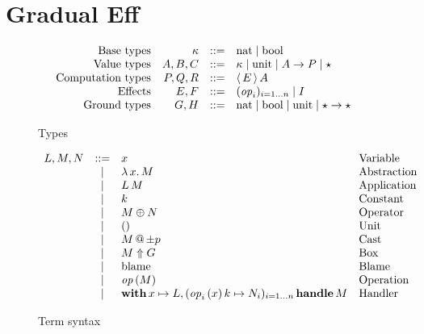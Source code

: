 \section{Gradual Eff}

\newcommand\ruledef{::=}
\newcommand\rulealt{\;|\;}
\newcommand\tyarr[2]{#1 \to #2}
\newcommand\tyany{\star}
\newcommand\cty[2]{\langle\,#1\,\rangle\,#2}
\newcommand\tynat{\mathrm{nat}}
\newcommand\tybool{\mathrm{bool}}
\newcommand\tyunit{\mathrm{unit}}
\newcommand\effany{\ding{73}}
\newcommand\effop{\mathit{op}}
\newcommand\app[2]{#1\,#2}
\newcommand\lam[2]{\lambda\, #1 .\, #2}
\newcommand\cast[2]{#1 \,\MVAt\, #2}
\newcommand\tbox[2]{#1 \Uparrow #2}
\newcommand\blame{\mathrm{blame}}
\newcommand\perform[2]{#1\left(#2\right)}
\newcommand\handle[2]{\mathbf{with}\,#1\,\mathbf{handle}\,#2}
\newcommand\fori[3]{(#3)_{#1=1\dots #2}}
\newcommand\treturn[1]{\mathbf{return}\,#1}

\begin{figure}
$$
\begin{array}{rrcll}
 \text{Base types} & \kappa  & \ruledef & \tynat \rulealt \tybool \\
 \text{Value types} & A, B, C & \ruledef & \kappa \rulealt \tyunit \rulealt \tyarr{A}{P} \rulealt \tyany & \\
 \text{Computation types} & P, Q, R & \ruledef & \cty{E}{A} &  \\
 \text{Effects} & E, F & \ruledef & \fori{i}{n}{\effop_i} \rulealt \effany & \\
 \text{Ground types} & G, H & \ruledef & \tynat \rulealt \tybool \rulealt \tyunit \rulealt \tyarr{\tyany}{\tyany}
\end{array}
$$
\caption{Types}
\label{fig:types}
\end{figure}

\begin{figure}
$$
\begin{array}{rcll}
 L, M, N & \ruledef & x & \text{Variable} \\
         & \rulealt & \lam{x}{M} & \text{Abstraction} \\
         & \rulealt & \app{L}{M} & \text{Application} \\
         & \rulealt & k & \text{Constant} \\
         & \rulealt & M \oplus N & \text{Operator} \\
         & \rulealt & () & \text{Unit} \\
         & \rulealt & \cast{M}{{\pm p}} & \text{Cast} \\
         & \rulealt & \tbox{M}{G} & \text{Box} \\
         & \rulealt & \blame & \text{Blame} \\
         & \rulealt & \perform{\effop}{M} & \text{Operation} \\
         & \rulealt & \handle{x \mapsto L, \fori{i}{n}{\perform{\effop_i}{x} k \mapsto N_i}}{M} & \text{Handler}
\end{array}
$$
\caption{Term syntax}
\label{fig:term-syntax}
\end{figure}

